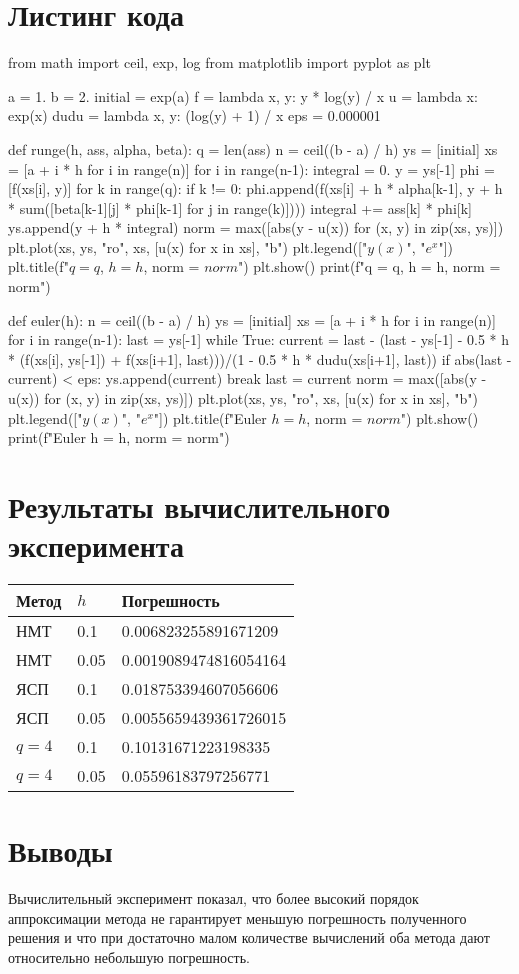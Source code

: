 \documentclass{article}
\begin{document}
\section*{Листинг кода}
\begin{python}
from math import ceil, exp, log
from matplotlib import pyplot as plt

a = 1.
b = 2.
initial = exp(a)
f = lambda x, y: y * log(y) / x
u = lambda x: exp(x)
dudu = lambda x, y: (log(y) + 1) / x
eps = 0.000001

def runge(h, ass, alpha, beta):
    q = len(ass)
    n = ceil((b - a) / h)
    ys = [initial]
    xs = [a + i * h for i in range(n)]
    for i in range(n-1):
        integral = 0.
        y = ys[-1]
        phi = [f(xs[i], y)]
        for k in range(q):
            if k != 0:
                phi.append(f(xs[i] + h * alpha[k-1], y + h * sum([beta[k-1][j] * phi[k-1] for j in range(k)])))
            integral += ass[k] * phi[k]
        ys.append(y + h * integral)
    norm = max([abs(y - u(x)) for (x, y) in zip(xs, ys)])
    plt.plot(xs, ys, "ro", xs, [u(x) for x in xs], "b")
    plt.legend(["$y(x)$", "$e^x$"])
    plt.title(f"$q = {q}$, $h = {h}$, norm = ${norm}$")
    plt.show()
    print(f"q = {q}, h = {h}, norm = {norm}")

def euler(h):
    n = ceil((b - a) / h)
    ys = [initial]
    xs = [a + i * h for i in range(n)]
    for i in range(n-1): 
        last = ys[-1]
        while True:
            current = last - (last - ys[-1] - 0.5 * h * (f(xs[i], ys[-1]) + f(xs[i+1], last)))/(1 - 0.5 * h * dudu(xs[i+1], last))
            if abs(last - current) < eps:
                ys.append(current)
                break
            last = current
    norm = max([abs(y - u(x)) for (x, y) in zip(xs, ys)])
    plt.plot(xs, ys, "ro", xs, [u(x) for x in xs], "b")
    plt.legend(["$y(x)$", "$e^x$"])
    plt.title(f"Euler $h = {h}$, norm = ${norm}$")
    plt.show()
    print(f"Euler h = {h}, norm = {norm}")
\end{python}
\section*{Результаты вычислительного эксперимента}
\begin{tabular}[H]{|l|l|l|}
  \hline
  Метод & $h$ & Погрешность \\
  \hline
  НМТ &   0.1         &    0.006823255891671209 \\
  НМТ &   0.05        & 0.0019089474816054164    \\
  ЯСП &   0.1         &  0.018753394607056606   \\
  ЯСП &   0.05        &   0.0055659439361726015  \\
  $   q=4 $    & 0.1  & 0.10131671223198335 \\
  $   q=4 $    & 0.05 &  0.05596183797256771\\
  \hline
\end{tabular} 
\section*{Выводы}
Вычислительный эксперимент показал, что более высокий порядок аппроксимации
метода не гарантирует меньшую погрешность полученного решения и что при
достаточно малом количестве вычислений оба метода дают относительно небольшую
погрешность.
\end{document}
